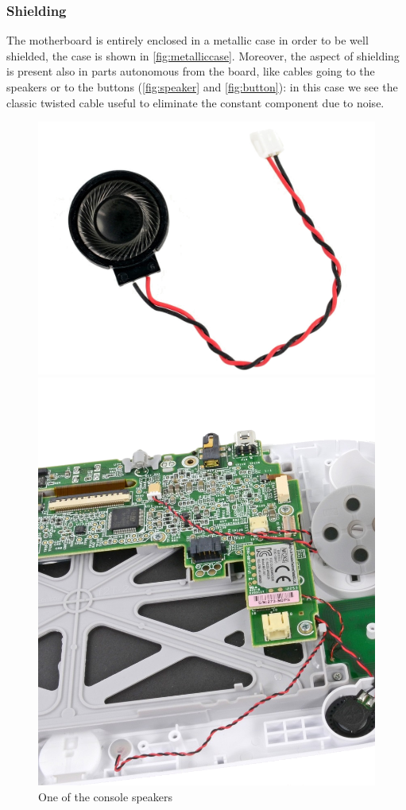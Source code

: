 \documentclass[11pt,a4paper,titlepage]{article}
\begin{document}
		  \subsubsection{Shielding}
				The motherboard is entirely enclosed in a metallic case in order to be well shielded, the case is shown in \autoref{fig:metalliccase}. Moreover, the aspect of shielding is present also in parts autonomous from the board, like cables going to the speakers or to the buttons (\autoref{fig:speaker} and \autoref{fig:button}): in this case we see the classic twisted cable useful to eliminate the constant component due to noise.

				\begin{figure}[h]
				  \begin{minipage}{.5 \textwidth}
						\centering
						\includegraphics[width = \textwidth]{speaker.png}
						\caption{One of the console speakers}
						\label{fig:speaker}
				  \end{minipage}
				  \vspace{5mm}
				  \begin{minipage}{.5 \textwidth}
						\centering
						\includegraphics[width = .8\textwidth]{buttons.png}

\end{minipage}
\end{figure}
\end{document}
